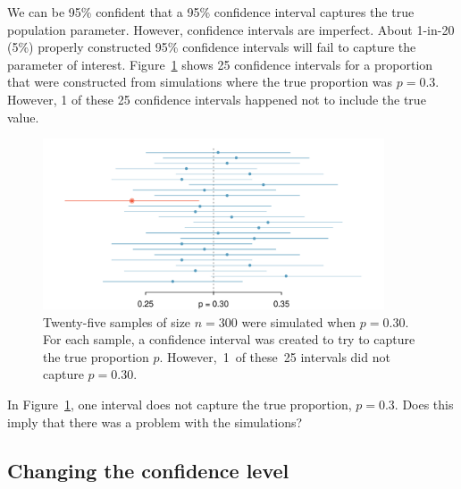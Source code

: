 We can be 95\% confident that a 95\% confidence interval captures the true population parameter. However, confidence intervals are imperfect. About 1-in-20 (5\%) properly constructed 95\% confidence intervals will fail to capture the parameter of interest. Figure~\ref{95PercentConfidenceInterval} shows 25 confidence intervals for a proportion that were constructed from simulations where the true proportion was $p = 0.3$. However, 1 of these 25 confidence intervals happened not to include the true value.

\begin{figure}[h]
\centering
\includegraphics[width=0.9\textwidth]{ch_foundations_for_inf/figures/95PercentConfidenceInterval/95PercentConfidenceInterval}
\caption{Twenty-five samples of size $n=300$ were simulated when $p = 0.30$. For each sample, a confidence interval was created to try to capture the true proportion $p$. However,~1~of these~25 intervals did not capture $p = 0.30$.}
\label{95PercentConfidenceInterval}
\end{figure}

\begin{exercisewrap}
\begin{nexercise}
In Figure~\ref{95PercentConfidenceInterval}, one interval does not capture the true proportion, $p = 0.3$. Does this imply that there was a problem with the simulations?\footnotemark
\end{nexercise}
\end{exercisewrap}

\subsection{Changing the confidence level}
\label{changingTheConfidenceLevelSection}


